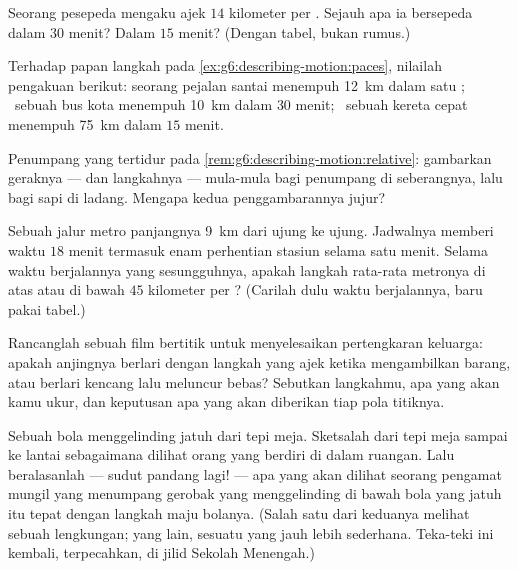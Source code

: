 \begin{exercise}[$\star$]\label{exo:g6:describing-motion:7}
Seorang pesepeda mengaku ajek $14$ kilometer per . Sejauh apa ia
bersepeda dalam $30$ menit? Dalam $15$ menit? (Dengan tabel, bukan
rumus.)
\end{exercise}

\begin{exercise}[$\star$]\label{exo:g6:describing-motion:8}
Terhadap papan langkah pada \cref{ex:g6:describing-motion:paces},
nilailah pengakuan berikut: seorang pejalan santai menempuh
\qty{12}{km} dalam satu ; \ sebuah bus kota menempuh \qty{10}{km}
dalam $30$ menit; \ sebuah kereta cepat menempuh \qty{75}{km} dalam
$15$ menit.
\end{exercise}

\begin{exercise}[$\star\star$]\label{exo:g6:describing-motion:9}
Penumpang yang tertidur pada
\cref{rem:g6:describing-motion:relative}: gambarkan geraknya ---
 dan langkahnya --- mula-mula bagi penumpang di seberangnya,
lalu bagi sapi di ladang. Mengapa kedua penggambarannya jujur?
\end{exercise}

\begin{exercise}[$\star\star$]\label{exo:g6:describing-motion:10}
Sebuah jalur metro panjangnya \qty{9}{km} dari ujung ke ujung.
Jadwalnya memberi waktu $18$ menit termasuk enam perhentian stasiun
selama satu menit. Selama waktu berjalannya yang sesungguhnya, apakah
langkah rata-rata metronya di atas atau di bawah $45$ kilometer per
? (Carilah dulu waktu berjalannya, baru pakai tabel.)
\end{exercise}

\begin{exercise}[$\star\star$]\label{exo:g6:describing-motion:11}
Rancanglah sebuah film bertitik untuk menyelesaikan pertengkaran
keluarga: apakah anjingnya berlari dengan langkah yang ajek ketika
mengambilkan barang, atau berlari kencang lalu meluncur bebas?
Sebutkan langkahmu, apa yang akan kamu ukur, dan keputusan apa yang
akan diberikan tiap pola titiknya.
\end{exercise}

\begin{exercise}[$\star\star\star$]\label{exo:g6:describing-motion:12}
Sebuah bola menggelinding jatuh dari tepi meja. Sketsalah 
dari tepi meja sampai ke lantai sebagaimana dilihat orang yang berdiri
di dalam ruangan. Lalu beralasanlah --- sudut pandang lagi! ---
 apa yang akan dilihat seorang pengamat mungil yang menumpang
gerobak yang menggelinding di bawah bola yang jatuh itu tepat dengan
langkah maju bolanya. (Salah satu dari keduanya melihat sebuah
lengkungan; yang lain, sesuatu yang jauh lebih sederhana. Teka-teki
ini kembali, terpecahkan, di jilid Sekolah Menengah.)
\end{exercise}

